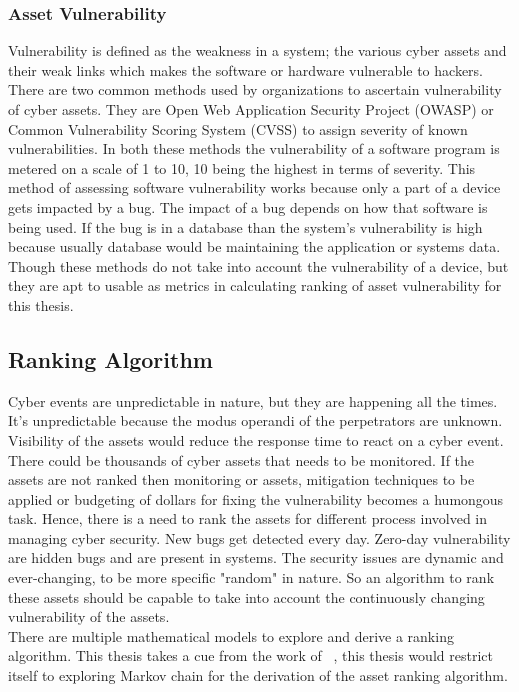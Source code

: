 \subsubsection{Asset Vulnerability}\label{sec:asset_vulner}
Vulnerability is defined as the weakness in a system; the various cyber assets and their weak links which makes the software or hardware vulnerable to hackers. There are two common methods used by organizations to ascertain vulnerability of cyber assets. They are Open Web Application Security Project (OWASP) or Common Vulnerability Scoring System (CVSS) to assign severity of known vulnerabilities. In both these methods the vulnerability of a software program is metered on a scale of 1 to 10, 10 being the highest in terms of severity. This method of assessing software vulnerability works because only a part of a device gets impacted by a bug. The impact of a bug depends on how that software is being used. If the bug is in a database than the system's vulnerability is high because usually database would be maintaining the application or systems data. Though these methods do not take into account the vulnerability of a device, but they are apt to usable as metrics in calculating ranking of asset vulnerability for this thesis.

\subsection{Ranking Algorithm}\label{sec:ranking}
Cyber events are unpredictable in nature, but they are happening all the times. It's unpredictable because the modus operandi of the perpetrators are unknown. Visibility of the assets would reduce the response time to react on a cyber event. There could be thousands of cyber assets that needs to be monitored. If the assets are not ranked then monitoring or assets, mitigation techniques to be applied or budgeting of dollars for fixing the vulnerability becomes a humongous task. Hence, there is a need to rank the assets for different process involved in managing cyber security.
New bugs get detected every day. Zero-day vulnerability are hidden bugs and are present in systems. The security issues are dynamic and ever-changing, to be more specific "random" in nature. So an algorithm to rank these assets should be capable to take into account the continuously changing vulnerability of the assets. \\
There are multiple mathematical models to explore and derive a ranking algorithm. This thesis takes a cue from the work of ~\cite{Pageetal98}, this thesis would restrict itself to exploring Markov chain for the derivation of the asset ranking algorithm.

